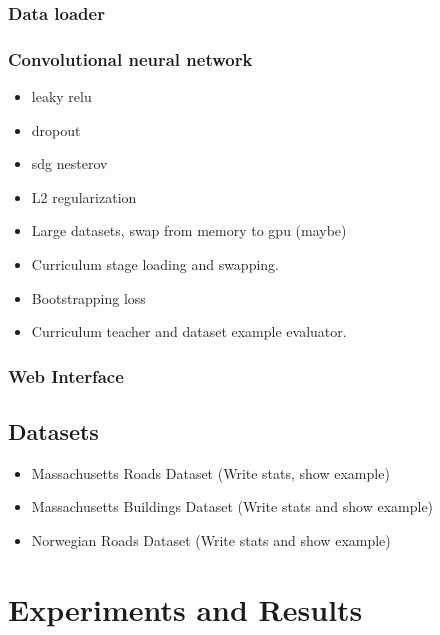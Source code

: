 \documentclass[a4paper]{book}
\begin{document}
\subsection{Data loader}

\subsection{Convolutional neural network}
\begin{itemize}
\item leaky relu
\item dropout
\item sdg nesterov
\item L2 regularization
\item Large datasets, swap from memory to gpu (maybe)
\item Curriculum stage loading and swapping.
\item Bootstrapping loss
\item Curriculum teacher and dataset example evaluator.
\end{itemize}
\subsection{Web Interface}

\section{Datasets}
\label{sec:datasets}
\begin{itemize}
\item Massachusetts Roads Dataset (Write stats, show example)
\item Massachusetts Buildings Dataset
(Write stats and show example)
\item Norwegian Roads Dataset
(Write stats and show example)
\end{itemize}





\chapter{Experiments and Results}
\label{cha:ResearchAndResults}
\end{document}
